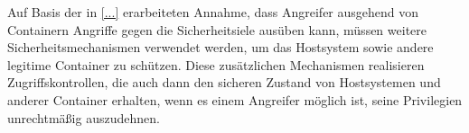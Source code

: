 \documentclass[../main.tex]{subfiles}
\begin{document}
  Auf Basis der in \ref{...} erarbeiteten Annahme, dass Angreifer ausgehend von Containern Angriffe gegen die Sicherheitsiele ausüben kann, müssen weitere Sicherheitsmechanismen verwendet werden, um das Hostsystem sowie andere legitime Container zu schützen. Diese zusätzlichen Mechanismen realisieren Zugriffskontrollen, die auch dann den sicheren Zustand von Hostsystemen und anderer Container erhalten, wenn es einem Angreifer möglich ist, seine Privilegien unrechtmäßig auszudehnen.











\end{document}
